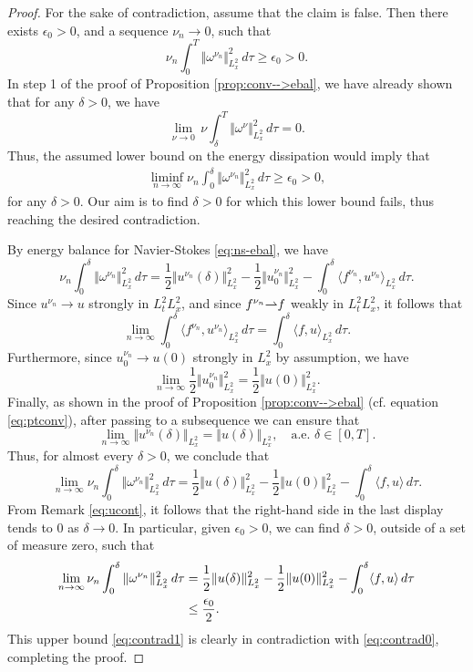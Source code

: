 \documentclass[reqno,12pt]{amsart}
\begin{document}
\begin{proof}
For the sake of contradiction, assume that the claim is false. Then there exists $\epsilon_0 > 0$, and a sequence $\nu_n \to 0$, such that
\[
\nu_n \int_0^T \Vert \omega^{\nu_n} \Vert_{L^2_x}^2 \, d\tau \ge \epsilon_0 > 0.
\]
In step 1 of the proof of Proposition \ref{prop:conv-->ebal}, we have already shown that for any $\delta > 0$, we have
\[
\lim_{\nu\to 0} \, \nu \int_{\delta}^T \Vert \omega^\nu \Vert^2_{L^2_x} \, d\tau = 0.
\]
Thus, the assumed lower bound on the energy dissipation would imply that
\begin{align}
\label{eq:contrad0}
\liminf_{n\to \infty} \nu_n \int_0^\delta \Vert \omega^{\nu_n} \Vert_{L^2_x}^2 \, d\tau \ge \epsilon_0 > 0,
\end{align}
for any $\delta > 0$. Our aim is to find $\delta>0$ for which this lower bound fails, thus reaching the desired contradiction.

By energy balance for Navier-Stokes \eqref{eq:ns-ebal}, we have
\[
 \nu_n \int_0^\delta \Vert \omega^{\nu_n} \Vert^2_{L^2_x} \, d\tau
 = \frac12 \Vert u^{\nu_n}(\delta) \Vert_{L^2_x}^2 - \frac12 \Vert u^{\nu_n}_0 \Vert_{L^2_x}^2 - \int_0^\delta \langle f^{\nu_n}, u^{\nu_n} \rangle_{L^2_x} \, d\tau.
\]
Since $u^{\nu_n} \to u$ strongly in $L^2_tL^2_x$, and since $f^{\nu_n} {\rightharpoonup} f$ weakly in $L^2_tL^2_x$, it follows that
\[
\lim_{n\to \infty} \int_0^\delta \langle f^{\nu_n}, u^{\nu_n} \rangle_{L^2_x} \, d\tau
=
\int_0^\delta \langle f, u \rangle_{L^2_x} \, d\tau.
\]
Furthermore, since $u_0^{\nu_n} \to u(0)$ strongly in $L^2_x$ by assumption, we have
\[
\lim_{n\to \infty}
\frac12 \Vert u^{\nu_n}_0 \Vert_{L^2_x}^2 = \frac12 \Vert u(0) \Vert_{L^2_x}^2.
\]
Finally, as shown in the proof of Proposition \ref{prop:conv-->ebal} (cf. equation \ref{eq:ptconv}), after passing to a subsequence we can ensure that
\[
\lim_{n\to \infty}\Vert u^{\nu_n}(\delta) \Vert_{L^2_x} = \Vert u(\delta) \Vert_{L^2_x}, \quad \text{a.e. } \delta \in [0,T].
\]
Thus, for almost every $\delta > 0$, we conclude that
\[
\lim_{n\to \infty}
\nu_n \int_0^\delta \Vert \omega^{\nu_n}\Vert_{L^2_x}^2 \, d\tau
=
\frac12 \Vert u(\delta) \Vert^2_{L^2_x} - \frac12 \Vert u(0) \Vert^2_{L^2_x} - \int_0^\delta \langle f, u \rangle \, d\tau.
\]
From Remark \ref{eq:ucont}, it follows that the right-hand side in the last display tends to $0$ as $\delta \to 0$. In particular, given $\epsilon_0>0$, we can find $\delta > 0$, outside of a set of measure zero, such that
\begin{align}
\lim_{n\to \infty}
\nu_n \int_0^\delta \Vert \omega^{\nu_n}\Vert_{L^2_x}^2 \, d\tau
&=
\frac12 \Vert u(\delta) \Vert^2_{L^2_x} - \frac12 \Vert u(0) \Vert^2_{L^2_x} - \int_0^\delta \langle f, u \rangle \, d\tau \notag
\\
&\le \frac{\epsilon_0}{2}. \label{eq:contrad1}
\end{align}
This upper bound \eqref{eq:contrad1} is clearly in contradiction with \eqref{eq:contrad0}, completing the proof.
\end{proof}
\end{document}
